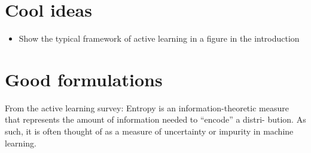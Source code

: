 \documentclass{article}
\theoremstyle{plain}
\theoremstyle{definition}
\theoremstyle{remark}
\begin{document}
\section{Cool ideas}
\begin{itemize}
	\item Show the typical framework of active learning in a figure in the introduction
\end{itemize}

\section{Good formulations}
From the active learning survey: Entropy is an information-theoretic
measure that represents the amount of information needed to “encode” a distri-
bution. As such, it is often thought of as a measure of uncertainty or impurity in machine learning.



\end{document}
